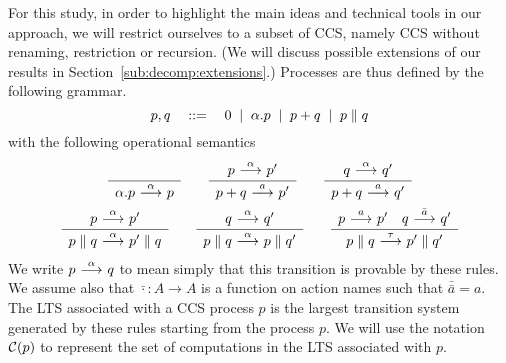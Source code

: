 For this study, 
in order to highlight the main ideas and technical tools in our approach,
we will restrict ourselves to a subset of CCS, namely CCS without
renaming, restriction or recursion. 
(We will discuss possible extensions of our results in 
Section~\ref{sub:decomp:extensions}.)
Processes are thus defined by the following
grammar.
\[
    p,q \quad::=\quad 0 \;\;|\;\; \alpha.p \;\;|\;\; p + q \;\;|\;\; p \parallel q
\]
with the following operational semantics
\begin{gather*}
    \sosrule{}{\alpha.p \trans{\alpha} p} \qquad
    \sosrule{p\trans{\alpha}p'}{p + q \trans{a} p'} \qquad
    \sosrule{q\trans{\alpha}q'}{p + q \trans{a} q'} \\
    \sosrule{p\trans{\alpha}p'}{p \parallel q \trans{\alpha} p' \parallel q} \qquad
    \sosrule{q\trans{\alpha}q'}{p \parallel q \trans{\alpha} p \parallel q'} \qquad
    \sosrule{p\trans{a}p'\quad q\trans{\bar{a}}q'}{p \parallel q \trans{\tau} p' \parallel q'}
\end{gather*}
We write $p\ {\stackrel{{\alpha}}{\longrightarrow}}\ q$ to mean simply that this transition is provable by
these rules. We assume also that $\bar{\cdot} : A\rightarrow A$ is a function on action names
such that $\bar{\bar{a}} = a$.
The LTS associated with a CCS process $p$ is the largest transition system 
generated by these
rules starting from the process $p$. 
We will use the notation $\mathcal{C}(p)$ to represent the set of computations in the
LTS associated with $p$.

